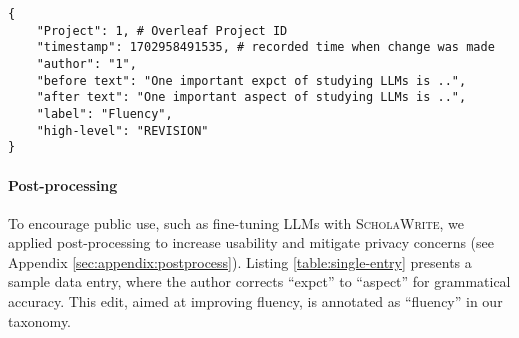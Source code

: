 

\begin{table}[t!]
\centering
\begin{minipage}{\linewidth}
\lstset{
    basicstyle=\ttfamily\footnotesize, %
    breaklines=true, %
    frame=single, %
    columns=fullflexible, %
    captionpos=b %
}
\begin{lstlisting}
{
    "Project": 1, # Overleaf Project ID
    "timestamp": 1702958491535, # recorded time when change was made
    "author": "1",
    "before text": "One important expct of studying LLMs is ..",
    "after text": "One important aspect of studying LLMs is ..",
    "label": "Fluency",
    "high-level": "REVISION"
}
\end{lstlisting}
\vspace{-3mm}
\label{table:single-entry}
\end{minipage}
\end{table}

\paragraph{Post-processing}


To encourage public use, such as fine-tuning LLMs with \textsc{ScholaWrite}, we applied post-processing to increase usability and mitigate privacy concerns (see Appendix \ref{sec:appendix:postprocess}). Listing \ref{table:single-entry} presents a sample data entry, where the author corrects ``expct'' to ``aspect'' for grammatical accuracy. This edit, aimed at improving fluency, is annotated as ``fluency'' in our taxonomy.

